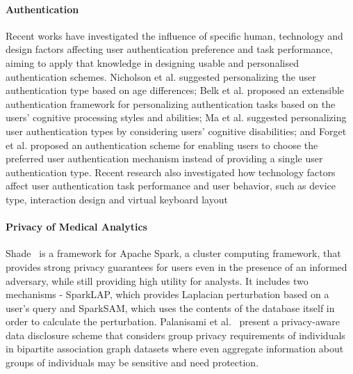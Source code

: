 \paragraph{Authentication}
Recent works have investigated the influence of specific human, technology and design factors affecting user authentication preference and task performance, aiming to apply that knowledge in designing usable and personalised authentication schemes. Nicholson et al. \cite{nicholson} suggested personalizing the user authentication type based on age differences; Belk et al. \cite{belk2017} proposed an extensible authentication framework for personalizing authentication tasks based on the users' cognitive processing styles and abilities; Ma et al. \cite{ma2013} suggested personalizing user authentication types by considering users' cognitive disabilities; and Forget et al. \cite{forget2015} proposed an authentication scheme for enabling users to choose the preferred user authentication mechanism instead of providing a single user authentication type. %
Recent research also investigated how technology factors affect user authentication task performance and user behavior, such as device type, interaction design and virtual keyboard layout \cite{vonzezschwitz}%

\paragraph{Privacy of Medical Analytics}
Shade~\cite{shade} is a framework for Apache Spark, a cluster computing framework, that provides strong privacy guarantees for users even in the presence of an informed adversary, while still providing high utility for analysts. It includes two mechanisms - SparkLAP, which provides Laplacian perturbation based on a user's query and SparkSAM, which uses the contents of the database itself in order to calculate the perturbation. Palanisami et al.~\cite{privacyAware} present a privacy-aware data disclosure scheme that considers group privacy requirements of individuals in bipartite association graph datasets where even aggregate information about groups of individuals may be sensitive and need protection.





